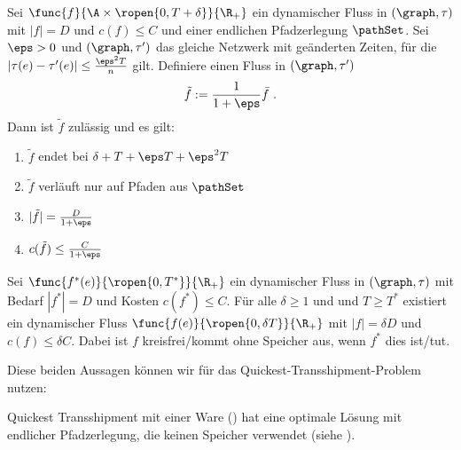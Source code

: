 \begin{theorem}\label{theo:slow_flow}
    Sei $\func{f}{\A \times \ropen{0, T + \delta}}{\R_+}$ ein dynamischer Fluss in
    $(\graph, \tau)$ mit $|f| = D$ und $c(f) \leq C$ und einer endlichen
    Pfadzerlegung $\pathSet$. Sei $\eps > 0$ und $(\graph, \tau')$ das
    gleiche Netzwerk mit geänderten Zeiten, für die
    $\left|\tau(e) - \tau'(e)\right| \leq \frac{\eps^2T}{n}$ gilt. Definiere
    einen Fluss in $(\graph, \tau')$
    \[
    \tilde{f} := \frac{1}{1+\eps} \bar{f} \text{ .}
    \]
    Dann ist $\tilde{f}$ zulässig und es gilt:
    \begin{enumerate}
        \item $\tilde{f}$ endet bei $\delta + T + \eps T + \eps^2 T$
        \item $\tilde{f}$ verläuft nur auf Pfaden aus $\pathSet$
        \item $|\tilde{f}| = \frac{D}{1 + \eps}$
        \item $c(\tilde{f}) \leq \frac{C}{1 + \eps}$
    \end{enumerate}
\end{theorem}

\begin{lemma}\label{lem:relaxed_flow}
    Sei $\func{f^*(e)}{\ropen{0,T^*}}{\R_+}$ ein dynamischer Fluss in $(\graph, \tau)$
    mit Bedarf $|f^*| = D$ und Kosten $c(f^*) \leq C$. Für alle $\delta \geq 1$ und
    und $T \geq T^*$ existiert ein dynamischer Fluss
    $\func{f(e)}{\ropen{0, \delta T}}{\R_+}$ mit $|f| = \delta D$ und
    $c(f) \leq \delta C$. Dabei ist $f$ kreisfrei/kommt ohne Speicher aus, wenn $f^*$
    dies ist/tut.
\end{lemma}

Diese beiden Aussagen können wir für das Quickest-Transshipment-Problem
nutzen:
\begin{theorem}\label{theo:qtp_opt_flow}
    Quickest Transshipment mit einer Ware ()
    hat eine optimale Lösung mit endlicher Pfadzerlegung,
    die keinen Speicher verwendet (siehe \cite[Corollary 4.5]{fleischerSiam}).
\end{theorem}

